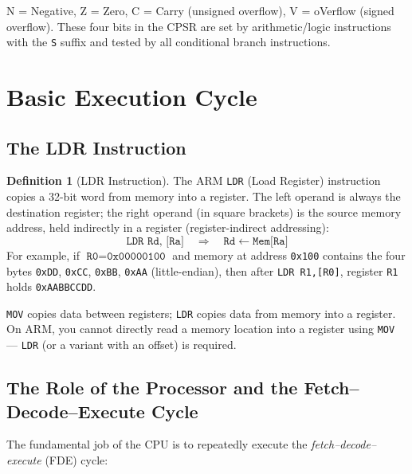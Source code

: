 \documentclass[11pt, a4paper, notitlepage]{report}
\theoremstyle{definition}
\newtheorem{definition}[theorem]{Definition}
\theoremstyle{remark}
\theoremstyle{definition}
\begin{document}
\begin{keyresult}[title={NZVC Flags}]
N = Negative, Z = Zero, C = Carry (unsigned overflow), V = oVerflow (signed overflow). These four bits in the CPSR are set by arithmetic/logic instructions with the \texttt{S} suffix and tested by all conditional branch instructions.
\end{keyresult}

\section{Basic Execution Cycle}

\subsection{The LDR Instruction}

\begin{definition}[LDR Instruction]
\label{def:ldr}
The ARM \texttt{LDR} (Load Register) instruction copies a 32-bit word from memory into a register. The left operand is always the destination register; the right operand (in square brackets) is the source memory address, held indirectly in a register (register-indirect addressing):
\[
  \texttt{LDR Rd, [Ra]} \quad\Longrightarrow\quad \texttt{Rd} \leftarrow \texttt{Mem[Ra]}
\]
For example, if $\texttt{R0} = \texttt{0x00000100}$ and memory at address \texttt{0x100} contains the four bytes \texttt{0xDD}, \texttt{0xCC}, \texttt{0xBB}, \texttt{0xAA} (little-endian), then after \texttt{LDR R1,[R0]}, register \texttt{R1} holds \texttt{0xAABBCCDD}.
\end{definition}

\begin{examtip}[title={LDR vs.\ MOV}]
\texttt{MOV} copies data between registers; \texttt{LDR} copies data from memory into a register. On ARM, you cannot directly read a memory location into a register using \texttt{MOV} --- \texttt{LDR} (or a variant with an offset) is required.
\end{examtip}

\subsection{The Role of the Processor and the Fetch--Decode--Execute Cycle}

The fundamental job of the CPU is to repeatedly execute the \emph{fetch--decode--execute} (FDE) cycle:
\end{document}
